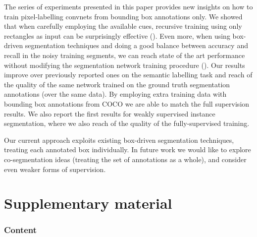 \documentclass[10pt,english,british,twocolumn]{article}
\begin{document}
The series of experiments presented in this paper provides new insights
on how to train pixel-labelling convnets from bounding box annotations
only. We showed that when carefully employing the available cues,
recursive training using only rectangles as input can be surprisingly
effective (). Even more, when using box-driven
segmentation techniques and doing a good balance between accuracy
and recall in the noisy training segments, we can reach state of the
art performance without modifying the segmentation network training
procedure (). Our results improve over
previously reported ones on the semantic labelling task and reach
 of the quality of the same network trained on the ground
truth segmentation annotations (over the same data). By employing
extra training data with bounding box annotations from COCO we are
able to match the full supervision results. We also report the first
results for weakly supervised instance segmentation, where we also
reach  of the quality of the fully-supervised training.

Our current approach exploits existing box-driven segmentation techniques,
treating each annotated box individually. In future work we would
like to explore co-segmentation ideas (treating the set of annotations
as a whole), and consider even weaker forms of supervision.



\clearpage{}


\appendix
\renewcommand{\thetable}{S\arabic{table}}\renewcommand{\thefigure}{S\arabic{figure}}

\part*{Supplementary material}

\setcounter{figure}{0}\setcounter{table}{0}

\section{\label{sec:Content}Content}
\end{document}
